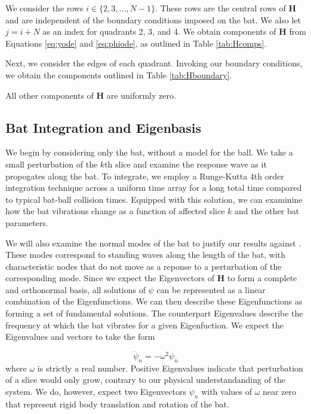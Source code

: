 \documentclass[linenumbers]{aastex7}
\begin{document}
We consider the rows $i \in \{2, 3, ..., N-1\}$. These rows are the central rows of $\mathbf{H}$ and are independent of the boundary conditions imposed on the bat. We also let $j = i + N$ as an index for quadrants 2, 3, and 4. We obtain components of $\mathbf{H}$ from Equations \ref{eq:yode} and \ref{eq:phiode}, as outlined in Table \ref{tab:Hcomps}.

Next, we consider the edges of each quadrant. Invoking our boundary conditions, we obtain the components outlined in Table \ref{tab:Hboundary}.

All other components of $\mathbf{H}$ are uniformly zero.

\subsection{Bat Integration and Eigenbasis}
We begin by considering only the bat, without a model for the ball. We take a small perturbation of the $k$th slice and examine the response wave as it propogates along the bat. To integrate, we employ a Runge-Kutta 4th order integration technique across a uniform time array for a long total time compared to typical bat-ball collision times. Equipped with this solution, we can examinine how the bat vibrations change as a function of affected slice $k$ and the other bat parameters.

We will also examine the normal modes of the bat to justify our results against \citet{nathanDynamicsBaseballBat2000a}. These modes correspond to standing waves along the length of the bat, with characteristic nodes that do not move as a reponse to a perturbation of the corresponding mode. Since we expect the Eigenvectors of $\mathbf{H}$ to form a complete and orthonormal basis, all solutions of $\psi$ can be represented as a linear combination of the Eigenfunctions. We can then describe these Eigenfunctions as forming a set of fundamental solutions.
The counterpart Eigenvalues describe the frequency at which the bat vibrates for a given Eigenfuction. We expect the Eigenvalues and vectors to take the form

\begin{equation}
    \ddot{\psi}_n = -\omega^2 \psi_n
\end{equation}
where $\omega$ is strictly a real number. Positive Eigenvalues indicate that perturbation of a slice would only grow, contrary to our physical understandanding of the system. We do, however, expect two Eigenvectors $\psi_n$ with values of $\omega$ near zero that represent rigid body translation and rotation of the bat. 
\end{document}

